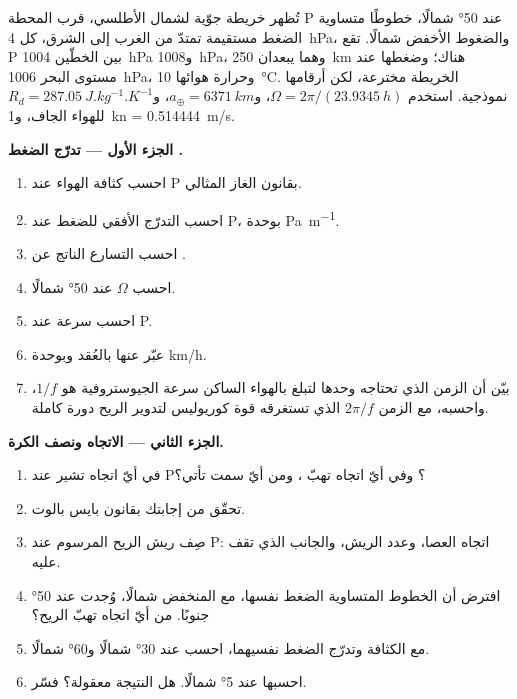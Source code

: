 \begin{problem}
\label{pb:b1:atmospheric-circulation:1}
تُظهر خريطة جوّية لشمال الأطلسي، قرب المحطة P عند \ang{50} شمالًا، خطوطًا متساوية الضغط مستقيمة تمتدّ من الغرب إلى الشرق، كل \qty{4}{hPa}، والضغوط الأخفض شمالًا. تقع P بين الخطّين \qty{1004}{hPa} و\qty{1008}{hPa}، وهما يبعدان \qty{250}{km} هناك؛ وضغطها عند مستوى البحر \qty{1006}{hPa}، وحرارة هوائها \qty{10}{\degreeCelsius}. الخريطة مخترعة، لكن أرقامها نموذجية. استخدم $\Omega = 2\pi/(\qty{23.9345}{h})$، و$a_\oplus = \qty{6371}{km}$، و$R_d =
\qty{287.05}{J.kg^{-1}.K^{-1}}$ للهواء الجاف، و\qty{1}{kn} = \qty{0.514444}{m/s}.

\medskip
\noindent\textbf{الجزء الأول --- تدرّج الضغط .}
\begin{enumerate}
  \item احسب كثافة الهواء عند P بقانون الغاز المثالي.
  \item احسب التدرّج الأفقي للضغط عند P، بوحدة \unit{Pa.m^{-1}}.
  \item احسب التسارع الناتج عن .
  \item احسب $\Omega$  عند \ang{50} شمالًا.
  \item احسب سرعة  عند P.
  \item عبّر عنها بالعُقد وبوحدة \unit{km/h}.
  \item بيّن أن الزمن الذي تحتاجه  وحدها لتبلغ بالهواء الساكن سرعة الجيوستروفية هو $1/f$، واحسبه، مع الزمن $2\pi/f$ الذي تستغرقه قوة كوريوليس لتدوير الريح دورة كاملة.
\end{enumerate}

\medskip
\noindent\textbf{الجزء الثاني --- الاتجاه ونصف الكرة.}
\begin{enumerate}[resume]
  \item في أيّ اتجاه تشير  عند P؟ وفي أيّ اتجاه تهبّ ، ومن أيّ سمت تأتي؟
  \item تحقّق من إجابتك بقانون بايس بالوت.
  \item صِف ريش الريح المرسوم عند P: اتجاه العصا، وعدد الريش، والجانب الذي تقف عليه.
  \item افترض أن الخطوط المتساوية الضغط نفسها، مع المنخفض شمالًا، وُجدت عند \ang{50} جنوبًا. من أيّ اتجاه تهبّ الريح؟
  \item مع الكثافة وتدرّج الضغط نفسيهما، احسب  عند \ang{30} شمالًا و\ang{60} شمالًا.
  \item احسبها عند \ang{5} شمالًا. هل النتيجة معقولة؟ فسّر.
\end{enumerate}


\end{problem}
